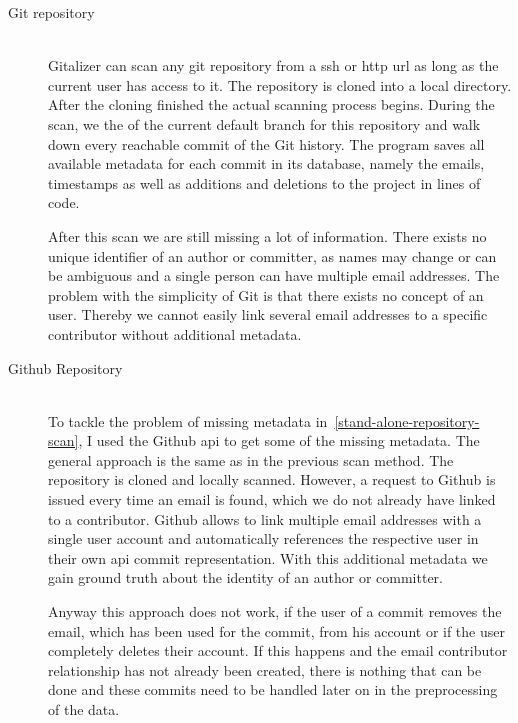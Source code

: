 \begin{description}
    \item[Git repository]\label{stand-alone-repository-scan} \hfill \\
        Gitalizer can scan any git repository from a \ac{ssh} or \ac{http} \acs{url} as long as the current user has access to it.
        The repository is cloned into a local directory. After the cloning finished the actual scanning process begins.
        During the scan, we  the  of the current default branch for this repository and walk down every reachable commit of the Git history.
        The program saves all available metadata for each commit in its database, namely the emails, timestamps as well as additions and deletions to the project in lines of code.

        After this scan we are still missing a lot of information.
        There exists no unique identifier of an author or committer, as names may change or can be ambiguous and a single person can have multiple email addresses.
        The problem with the simplicity of Git is that there exists no concept of an user.
        Thereby we cannot easily link several email addresses to a specific contributor without additional metadata.


    \item[Github Repository]\label{github-repo-scan} \hfill \\
        To tackle the problem of missing metadata in~\ref{stand-alone-repository-scan}, I used the Github \ac{api} to get some of the missing metadata.
        The general approach is the same as in the previous scan method. The repository is cloned and locally scanned.
        However, a request to Github is issued every time an email is found, which we do not already have linked to a contributor.
        Github allows to link multiple email addresses with a single user account and automatically references the respective user in their own \ac{api} commit representation.
        With this additional metadata we gain ground truth about the identity of an author or committer.

        Anyway this approach does not work, if the user of a commit removes the email, which has been used for the commit, from his account or if the user completely deletes their account.
        If this happens and the email contributor relationship has not already been created, there is nothing that can be done and these commits need to be handled later on in the preprocessing of the data.


\end{description}
